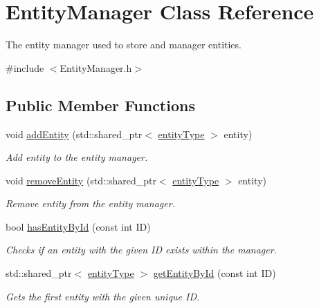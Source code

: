 \hypertarget{class_entity_manager}{\section{Entity\-Manager Class Reference}
\label{d0/d89/class_entity_manager}
}


The entity manager used to store and manager entities.  




{\ttfamily \#include $<$Entity\-Manager.\-h$>$}

\subsection*{Public Member Functions}
\begin{DoxyCompactItemize}
\item 
void \hyperlink{class_entity_manager_ad9dca8a5918113b2ed10b330e0c1b8f3}{add\-Entity} (std\-::shared\-\_\-ptr$<$ \hyperlink{_abstract_entity_8h_a5b087f4ada5a2395ba03ae7d01b56568}{entity\-Type} $>$ entity)
\begin{DoxyCompactList}\small\item\em Add entity to the entity manager. \end{DoxyCompactList}\item 
void \hyperlink{class_entity_manager_a2f46084a98181c3f8e1c09182104e385}{remove\-Entity} (std\-::shared\-\_\-ptr$<$ \hyperlink{_abstract_entity_8h_a5b087f4ada5a2395ba03ae7d01b56568}{entity\-Type} $>$ entity)
\begin{DoxyCompactList}\small\item\em Remove entity from the entity manager. \end{DoxyCompactList}\item 
bool \hyperlink{class_entity_manager_a4a7fa9f2086a4dfc890211111a86675c}{has\-Entity\-By\-Id} (const int I\-D)
\begin{DoxyCompactList}\small\item\em Checks if an entity with the given I\-D exists within the manager. \end{DoxyCompactList}\item 
std\-::shared\-\_\-ptr$<$ \hyperlink{_abstract_entity_8h_a5b087f4ada5a2395ba03ae7d01b56568}{entity\-Type} $>$ \hyperlink{class_entity_manager_a7f18391fbaa2ddd29957b74789dd487b}{get\-Entity\-By\-Id} (const int I\-D)
\begin{DoxyCompactList}\small\item\em Gets the first entity with the given unique I\-D. \end{DoxyCompactList}\item 

\end{DoxyCompactItemize}

